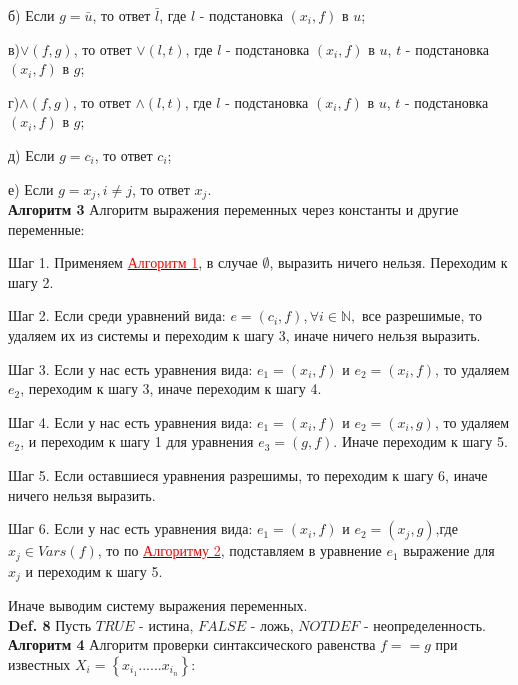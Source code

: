 \documentclass[12pt]{article}
\begin{document}
    б) Если $g = \bar{u}$, то ответ $\bar{l}$, где $l$ - подстановка $ (x_{i},f) $ в $u$;
    
    в)$\vee (f, g)$, то ответ $\vee(l,t)$, где $l$ - подстановка $ (x_{i},f) $ в $u$,  $t$ - подстановка $ (x_{i},f) $ в $g$;
    
    г)$\wedge (f, g)$, то ответ $\wedge(l,t)$, где $l$ - подстановка $ (x_{i},f) $ в $u$, $t$ - подстановка $ (x_{i},f) $ в $g$;
    
    д) Если $g = c_{i}$, то ответ $c_{i}$;
    
    е) Если $g = x_{j}, i \neq j$, то ответ $x_{j}$.
     \\
     
      \hypertarget{a3}{{\bf Алгоритм 3}} Алгоритм выражения переменных через константы и другие переменные:
     
     Шаг 1. Применяем \hyperlink{a1}{ \textcolor{red} {Алгоритм 1}}, в случае  $   \emptyset $, выразить ничего нельзя. Переходим к шагу 2.
     
     Шаг 2. Если среди уравнений вида: $e =(c_{i},f), \forall i \in \mathbb{N},$ все разрешимые, то удаляем  их из системы и переходим к шагу 3, иначе ничего нельзя выразить.
     
     
     Шаг 3. Если у нас есть уравнения вида: $e_{1} =(x_{i},f)$ и $e_{2} =(x_{i},f)$, то удаляем $e_{2}$, переходим к шагу 3, иначе переходим к шагу 4.
     
     Шаг 4. Если у нас есть уравнения вида: $e_{1} =(x_{i},f)$ и $e_{2} =(x_{i},g)$, то удаляем $e_{2}$, и переходим к  шагу 1 для  уравнения   $e_{3} =(g,f)$. Иначе переходим к шагу 5.
     
     Шаг 5. Если оставшиеся уравнения разрешимы, то переходим к шагу 6, иначе ничего нельзя выразить.
     
     Шаг 6. Если у нас есть уравнения вида: $e_{1} =(x_{i},f)$ и $e_{2} =(x_{j},g)$,где $x_{j} \in Vars(f)$, то по \hyperlink{a2}{ \textcolor{red}{Алгоритму 2}}, подставляем в уравнение $e_{1}$ выражение для $x_{j}$ и переходим к шагу 5. 
     
     Иначе выводим систему выражения переменных. 
     \\
     
     {\bf Def. 8} Пусть $TRUE$ - истина, $FALSE$ - ложь, $NOTDEF$ - неопределенность.
     \\
     
     \hypertarget{a4}{{\bf Алгоритм 4}} Алгоритм проверки синтаксического равенства $f == g $ при известных $ X_{i} = \left\lbrace x_{i_{1}} ......x_{i_{n}}\right\rbrace $: 
     
\end{document}
